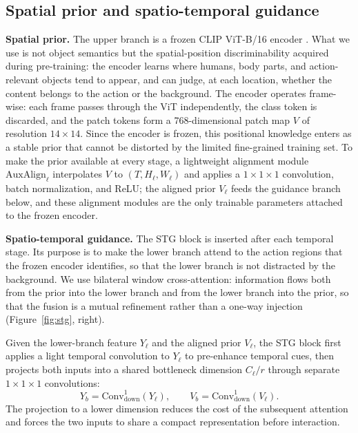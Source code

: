 \subsection{Spatial prior and spatio-temporal guidance}
\label{sec:stg}

\textbf{Spatial prior.}
The upper branch is a frozen CLIP ViT-B/16 encoder \cite{radford2021clip}.
What we use is not object semantics but the spatial-position discriminability
acquired during pre-training: the encoder learns where humans, body parts,
and action-relevant objects tend to appear, and can judge, at each location,
whether the content belongs to the action or the background. The encoder
operates frame-wise: each frame passes through the ViT independently, the
class token is discarded, and the patch tokens form a 768-dimensional patch
map $V$ of resolution $14\times 14$. Since the encoder is frozen, this
positional knowledge enters as a stable prior that cannot be distorted by the
limited fine-grained training set. To make the prior available at every
stage, a lightweight alignment module $\mathrm{AuxAlign}_\ell$ interpolates
$V$ to
$(T, H_\ell, W_\ell)$ and applies a $1\times1\times1$ convolution, batch
normalization, and ReLU; the aligned prior $V_\ell$ feeds the guidance branch
below, and these alignment modules are the only trainable parameters attached
to the frozen encoder.

\textbf{Spatio-temporal guidance.}
The STG block is inserted after each temporal stage. Its purpose is to make
the lower branch attend to the action regions that the frozen encoder
identifies, so that the lower branch is not distracted by the background. We
use bilateral window cross-attention: information flows both from the prior
into the lower branch and from the lower branch into the prior, so that the
fusion is a mutual refinement rather than a one-way injection
(Figure~\ref{fig:stg}, right).

Given the lower-branch feature $Y_\ell$ and the aligned prior $V_\ell$, the STG
block first applies a light temporal convolution to $Y_\ell$ to pre-enhance
temporal cues, then projects both inputs into a shared bottleneck dimension
$C_\ell / r$ through separate $1\times1\times1$ convolutions:
\begin{equation}
  Y_b = \mathrm{Conv}^{1}_\mathrm{down}(Y_\ell), \qquad
  V_b = \mathrm{Conv}^{1}_\mathrm{down}(V_\ell).
\end{equation}
The projection to a lower dimension reduces the cost of the subsequent
attention and forces the two inputs to share a compact representation before
interaction.


